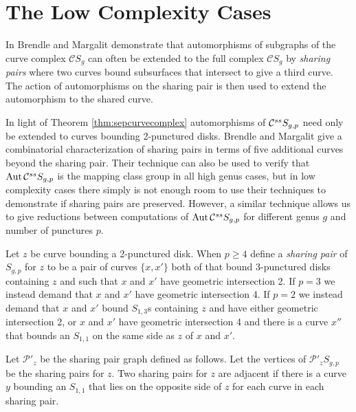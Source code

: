 \section{The Low Complexity Cases}
\label{sect:leftovers}

\begin{remark}
  In \cite{meta}
  Brendle and Margalit %
  demonstrate that automorphisms of subgraphs of the curve complex $\mathcal C S_{g}$
  can often be extended to the full complex $\mathcal C S_{g}$ by \emph{sharing pairs}
  where two curves bound subsurfaces that intersect to give a third curve.
  The action of automorphisms on the sharing pair is then used to extend the automorphism to the shared curve.

  In light of Theorem \ref{thm:sepcurvecomplex}
  automorphisms of  $ \mathcal C^{{ss}}  S_{g,p}$ need only be extended to curves bounding 2-punctured disks.
  Brendle and Margalit give a combinatorial characterization of sharing pairs in terms of
  five additional curves beyond the sharing pair.
  Their technique can also be used to verify that $\operatorname{Aut}  \mathcal C^{{ss}}  S_{g,p}$ is the mapping class group
  in all high genus cases, but in low complexity cases there simply is not enough
  room to use their techniques to demonstrate if sharing pairs are preserved.
  However, a similar technique allows us to give reductions between computations of $\operatorname{Aut}  \mathcal C^{{ss}}  S_{g,p}$
  for different genus $g$ and number of punctures $p$.
\end{remark}

\begin{definition}
  Let $z$ be curve bounding a 2-punctured disk.
  When $p\geq 4$ define a \emph{sharing pair} of $S_{g,p}$ for $z$ to be a pair of curves $\{x,x'\}$
  both of that bound 3-punctured disks containing $z$ and such that $x$ and $x'$ have geometric intersection 2.
  If $p =3$ we instead demand that $x$ and $x'$ have geometric intersection 4.
  If $p=2$ we instead demand that $x$ and $x'$ bound $S_{1,3}$s containing $z$ and have either geometric intersection 2,
  or $x$ and $x'$ have geometric intersection 4 and there is a curve $x''$ that bounds an $S_{1,1}$ on the same side as $z$ of $x$ and $x'$.

  Let  $\mathcal P'_z$ be the sharing pair graph defined as follows.
  Let the vertices of $\mathcal P'_z S_{g,p}$ be the sharing pairs for $z$.
  Two sharing pairs for $z$ are adjacent if there is a curve $y$ bounding an $S_{1,1}$
  that lies on the opposite side of $z$ for each curve in each sharing pair.
\end{definition}

